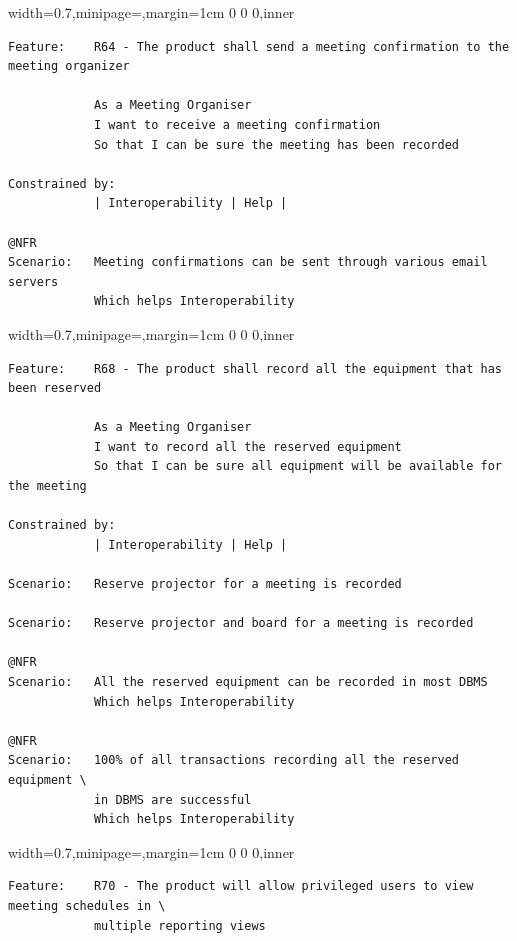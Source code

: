 \documentclass[dissertation,final]{softeng}
\newenvironment{featurecode}[1]
{ \lrbox\featurebox \begin{adjustbox}{width=#1\textwidth,minipage=\textwidth,margin=1cm 0 0 0,inner} }
{ \end{adjustbox}\endlrbox}
\newenvironment{featurelist}[2]
{
\newcommand{\setcaption}{\caption{#1}}
\newcommand{\setlabel}{\label{#2}}
}
{\begin{listing}[h!]\centering\usebox\featurebox\setcaption\setlabel\end{listing}}
\begin{document}
\begin{appendices}
\begin{featurelist}{R64 -- The product shall send a meeting confirmation to the meeting organizer}{lst:feature_r64}
\begin{featurecode}{0.7}
\begin{verbatim}
Feature:    R64 - The product shall send a meeting confirmation to the meeting organizer

            As a Meeting Organiser
            I want to receive a meeting confirmation
            So that I can be sure the meeting has been recorded
	
Constrained by:
            | Interoperability | Help |

@NFR	
Scenario:   Meeting confirmations can be sent through various email servers
            Which helps Interoperability
\end{verbatim}
\end{featurecode}
\end{featurelist}
\clearpage

\begin{featurelist}{R68 -- The product shall record all the equipment that has been reserved}{lst:feature_r68}
\begin{featurecode}{0.7}
\begin{verbatim}
Feature:    R68 - The product shall record all the equipment that has been reserved

            As a Meeting Organiser
            I want to record all the reserved equipment
            So that I can be sure all equipment will be available for the meeting
	
Constrained by:
            | Interoperability | Help |

Scenario:   Reserve projector for a meeting is recorded

Scenario:   Reserve projector and board for a meeting is recorded	

@NFR	
Scenario:   All the reserved equipment can be recorded in most DBMS
            Which helps Interoperability

@NFR	
Scenario:   100% of all transactions recording all the reserved equipment \
            in DBMS are successful
            Which helps Interoperability
\end{verbatim}
\end{featurecode}
\end{featurelist}

\begin{featurelist}{R70 -- The product will allow privileged users to view meeting schedules}{lst:feature_r70}
\begin{featurecode}{0.7}
\begin{verbatim}
Feature:    R70 - The product will allow privileged users to view meeting schedules in \ 
            multiple reporting views


\end{verbatim}
\end{featurecode}
\end{featurelist}
\end{appendices}
\end{document}
